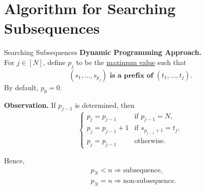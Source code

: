 \section{Algorithm for Searching Subsequences}
\begin{frame}{Searching Subsequences}
	\textbf{Dynamic Programming Approach.} \\
	For $j \in [N]$, define $p_j$ to be the \underline{maximum value} such that 
	\begin{equation*}
		\textbf{$(s_1, \dots, s_{p_j})$ is a prefix of $(t_1, \dots, t_j)$.}
	\end{equation*}
	By default, $p_0 = 0$.
	
	\textbf{Observation.} If $p_{j - 1}$ is determined, then
	\begin{equation*}
		\begin{cases}
			p_j = p_{j - 1} &\text{if $p_{j - 1} = N$},\\
			p_j = p_{j - 1} + 1 &\text{if $s_{p_{j - 1} + 1} = t_j$},\\
			p_j = p_{j - 1} &\text{otherwise}.
		\end{cases}
	\end{equation*}
	
	Hence,
	\begin{equation*}
		\begin{aligned}
			&p_N < n \Rightarrow \text{subsequence},\\
			&p_N = n \Rightarrow \text{non-subsequence}.
		\end{aligned}
	\end{equation*}
\end{frame}